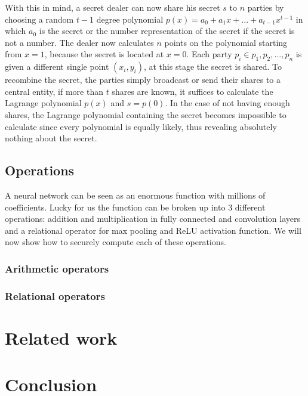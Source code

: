 With this in mind, a secret dealer can now share his secret $s$ to $n$ parties by choosing a random $t-1$ degree polynomial $p(x)=a_{0} + a_{1}x + ... + a_{t-1}x^{t-1}$ in which $a_{0}$ is the secret or the number representation of the secret if the secret is not a number. The dealer now calculates $n$ points on the polynomial starting from $x=1$, because the secret is located at $x=0$. Each party $p_i \in {p_1, p_2, ..., p_n}$ is given a different single point $(x_i,y_i)$, at this stage the secret is shared. To recombine the secret, the parties simply broadcast or send their shares to a central entity, if more than $t$ shares are known, it suffices to calculate the Lagrange polynomial $p(x)$ and $s=p(0)$. In the case of not having enough shares, the Lagrange polynomial containing the secret becomes impossible to calculate since every polynomial is equally likely, thus revealing absolutely nothing about the secret.

\subsection{Operations}
A neural network can be seen as an enormous function with millions of coefficients. Lucky for us the function can be broken up into 3 different operations: addition and multiplication in fully connected and convolution layers and a relational operator for max pooling and ReLU activation function. We will now show how to securely compute each of these operations.
\subsubsection{Arithmetic operators}
\subsubsection{Relational operators}

\section{Related work}

\section{Conclusion}
